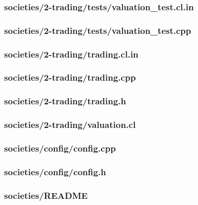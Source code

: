 \documentclass{article}
\begin{document}
\subsubsection*{societies/2-trading/tests/valuation\_test.cl.in}


\subsubsection*{societies/2-trading/tests/valuation\_test.cpp}


\subsubsection*{societies/2-trading/trading.cl.in}


\subsubsection*{societies/2-trading/trading.cpp}


\subsubsection*{societies/2-trading/trading.h}


\subsubsection*{societies/2-trading/valuation.cl}


\subsubsection*{societies/config/config.cpp}


\subsubsection*{societies/config/config.h}


\subsubsection*{societies/README}

\end{document}
